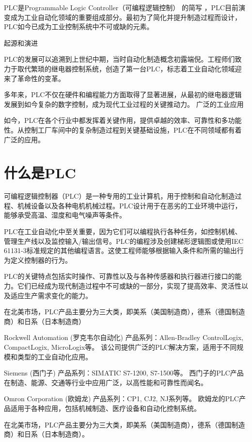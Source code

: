 \documentclass{book}
\begin{document}
	
	PLC是Programmable Logic Controller（可编程逻辑控制） 的简写 ，PLC目前演变成为工业自动化领域的重要组成部分。最初为了简化并提升制造过程而设计，PLC如今已成为工业控制系统中不可或缺的元素。
	
	起源和演进
	
	PLC的发展可以追溯到上世纪中期，当时自动化制造概念初露端倪。工程师们致力于取代繁琐的继电器控制系统，创造了第一台PLC，标志着工业自动化领域迎来了革命性的变革。
	
	多年来，PLC不仅在硬件和编程能力方面取得了显著进展，从最初的继电器逻辑发展到如今复杂的数字控制，成为现代工业过程的关键推动力。
	广泛的工业应用
	
	如今，PLC在各个行业中都发挥着关键作用，提供卓越的效率、可靠性和多功能性。从控制工厂车间中的复杂制造过程到关键基础设施，PLC在不同领域都有着广泛的应用。
	
	\section{什么是PLC} 
	可编程逻辑控制器（PLC）是一种专用的工业计算机，用于控制和自动化制造过程、机械设备以及各种电机机械过程。PLC设计用于在恶劣的工业环境中运行，能够承受高温、湿度和电气噪声等条件。
	
	PLC在工业自动化中至关重要，因为它们可以编程执行各种任务，如控制机械、管理生产线以及监控输入/输出信号。PLC的编程涉及创建梯形逻辑图或使用IEC 61131-3标准规定的其他编程语言。这使工程师能够根据输入条件和所需的输出行为定义控制器的行为。
	
	PLC的关键特点包括实时操作、可靠性以及与各种传感器和执行器进行接口的能力。它们已经成为现代制造过程中不可或缺的一部分，实现了提高效率、灵活性以及适应生产需求变化的能力。
	
在北美市场，PLC产品主要分为三大类，即美系（美国制造商），德系（德国制造商）和日系（日本制造商）
	
	Rockwell Automation (罗克韦尔自动化)
	产品系列：Allen-Bradley ControlLogix, CompactLogix, MicroLogix等。
	该公司提供广泛的PLC解决方案，适用于不同规模和类型的工业自动化应用。
	
	Siemens (西门子)
	产品系列：SIMATIC S7-1200, S7-1500等。
	西门子的PLC产品在制造、能源、交通等行业中应用广泛，以高性能和可靠性而闻名。
	
	Omron Corporation (欧姆龙)	
	产品系列：CP1, CJ2, NJ系列等。
	欧姆龙的PLC产品适用于各种应用，包括机械制造、医疗设备和自动化控制系统。
	
	在北美市场，PLC产品主要分为三大类，即美系（美国制造商），德系（德国制造商）和日系（日本制造商）。
	
\end{document}
